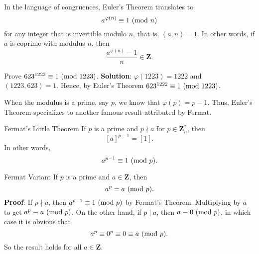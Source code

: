 In the language of congruences, Euler's Theorem translates to
\[ a^{\varphi(n)}\equiv 1\ (\mathrm{mod}\ n) \]
for any integer that is invertible modulo $ n $, that is, $ (a,n)=1 $. In other words,
if $ a $ is coprime with modulus $ n $, then
\[ \frac{a^{\varphi(n)}-1}{n}\in\mathbf{Z}. \]
\begin{Example}{}{}
    Prove $ 623^{1222}\equiv 1\ (\mathrm{mod}\ 1223) $.
    \tcblower{}
    \textbf{Solution}: $ \varphi(1223)=1222 $ and $ (1223,623)=1 $. Hence, by Euler's Theorem
    $ 623^{1222}\equiv 1\ (\mathrm{mod}\ 1223) $.
\end{Example}
When the modulus is a prime, say $ p $, we know that $ \varphi(p)=p-1 $.
Thus, Euler's Theorem specializes to another famous result attributed by Fermat.
\begin{Theorem}{Fermat's Little Theorem}{}
    If $ p $ is a prime and $ p\nmid a $ for $ p\in\mathbf{Z}_n^* $, then
    \[ [a]^{p-1}=[1]. \]
    In other words,
    \[ a^{p-1}\equiv 1\ (\mathrm{mod}\ p). \]
\end{Theorem}
\begin{Corollary}{Fermat Variant}{}
    If $ p $ is a prime and $ a\in\mathbf{Z} $, then
    \[ a^{p}=a\ (\mathrm{mod}\ p). \]
    \tcblower{}
    \textbf{Proof}: If $ p\nmid a $, then $ a^{p-1}\equiv 1\ (\mathrm{mod}\ p) $ by Fermat's Theorem.
    Multiplying by $ a $ to get $ a^p\equiv a\ (\mathrm{mod}\ p) $. On the other hand,
    if $ p\mid a $, then $ a\equiv 0\ (\mathrm{mod}\ p) $, in which case it is obvious that
    \[ a^p\equiv 0^p\equiv 0\equiv a\ (\mathrm{mod}\ p). \]
    So the result holds for all $ a\in\mathbf{Z} $.
\end{Corollary}
